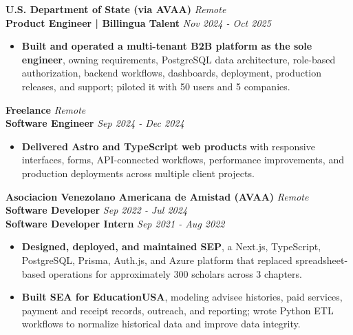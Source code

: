 \documentclass[10pt]{article}
\begin{document}
\vspace{2pt}
\textbf{U.S. Department of State (via AVAA)} \hfill \textit{Remote} \\
\textbf{Product Engineer | Billingua Talent} \hfill \textit{Nov 2024 - Oct 2025}
\begin{itemize}
    \item \textbf{Built and operated a multi-tenant B2B platform as the sole engineer}, owning requirements, PostgreSQL data architecture, role-based authorization, backend workflows, dashboards, deployment, production releases, and support; piloted it with 50 users and 5 companies.
\end{itemize}

\vspace{2pt}
\textbf{Freelance} \hfill \textit{Remote} \\
\textbf{Software Engineer} \hfill \textit{Sep 2024 - Dec 2024}
\begin{itemize}
    \item \textbf{Delivered Astro and TypeScript web products} with responsive interfaces, forms, API-connected workflows, performance improvements, and production deployments across multiple client projects.
\end{itemize}

\vspace{2pt}
\textbf{Asociacion Venezolano Americana de Amistad (AVAA)} \hfill \textit{Remote} \\
\textbf{Software Developer} \hfill \textit{Sep 2022 - Jul 2024} \\
\textbf{Software Developer Intern} \hfill \textit{Sep 2021 - Aug 2022}
\begin{itemize}
    \item \textbf{Designed, deployed, and maintained SEP}, a Next.js, TypeScript, PostgreSQL, Prisma, Auth.js, and Azure platform that replaced spreadsheet-based operations for approximately 300 scholars across 3 chapters.
    \item \textbf{Built SEA for EducationUSA}, modeling advisee histories, paid services, payment and receipt records, outreach, and reporting; wrote Python ETL workflows to normalize historical data and improve data integrity.
\end{itemize}
\end{document}

